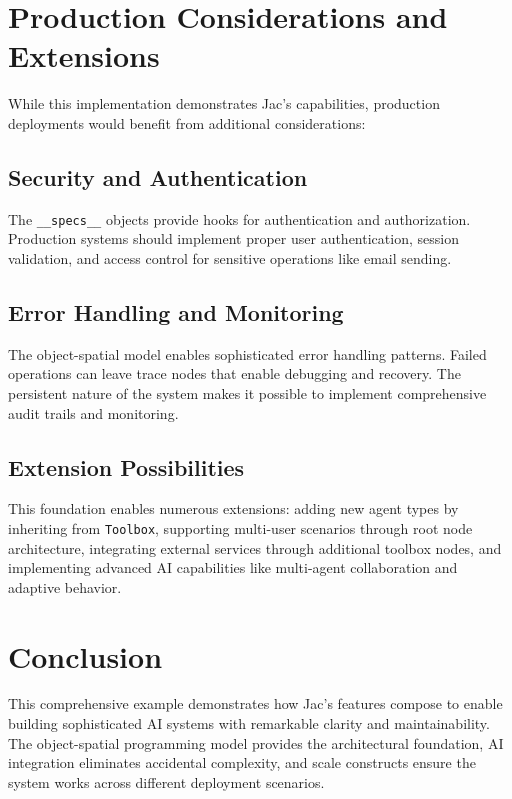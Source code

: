 \section{Production Considerations and Extensions}

While this implementation demonstrates Jac's capabilities, production deployments would benefit from additional considerations:

\subsection{Security and Authentication}

The \texttt{\_\_specs\_\_} objects provide hooks for authentication and authorization. Production systems should implement proper user authentication, session validation, and access control for sensitive operations like email sending.

\subsection{Error Handling and Monitoring}

The object-spatial model enables sophisticated error handling patterns. Failed operations can leave trace nodes that enable debugging and recovery. The persistent nature of the system makes it possible to implement comprehensive audit trails and monitoring.

\subsection{Extension Possibilities}

This foundation enables numerous extensions: adding new agent types by inheriting from \texttt{Toolbox}, supporting multi-user scenarios through root node architecture, integrating external services through additional toolbox nodes, and implementing advanced AI capabilities like multi-agent collaboration and adaptive behavior.

\section{Conclusion}

This comprehensive example demonstrates how Jac's features compose to enable building sophisticated AI systems with remarkable clarity and maintainability. The object-spatial programming model provides the architectural foundation, AI integration eliminates accidental complexity, and scale constructs ensure the system works across different deployment scenarios.

